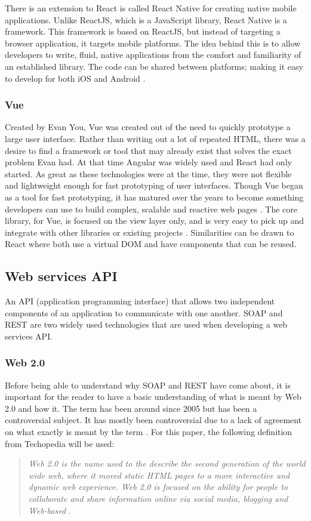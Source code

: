 There is an extension to React is called React Native for creating native mobile applications. Unlike ReactJS, which is a JavaScript library,
React Native is a framework. 
This framework is based on ReactJS, but instead of targeting a browser application, it targets mobile platforms.
The idea behind this is to allow developers to write, fluid, native applications from the comfort and familiarity of an established library.
The code can be shared between platforms; making it easy to develop for both iOS and Android \cite{eisenman2015learning}.

\subsubsection{Vue}
Created by Evan You, Vue was created out of the need to quickly prototype a large user interface.
Rather than writing out a lot of repeated HTML, there was a desire to find a framework or tool that may already exist that solves the exact problem Evan had.
At that time Angular was widely used and React had only started. As great as these technologies were at the time, they were not flexible and lightweight
enough for fast prototyping of user interfaces. Though Vue began as a tool for fast prototyping, it has matured over the
years to become something developers can use to build complex, scalable and reactive web pages \cite{filipova2016learning}.
The core library, for Vue, is focused on the view layer only, and is very easy to pick up and integrate with other libraries or existing projects \cite{koetsier2016evaluation}.
Similarities can be drawn to React where both use a virtual DOM and have components that can be reused.

\subsection{Web services API} \label{web services}
An API (application programming interface) that allows two independent components of an application to communicate with one another.
SOAP and REST are two widely used technologies that are used when developing a web services API.

\subsubsection{Web 2.0}
Before being able to understand why SOAP and REST have come about, it is important for the reader to have a basic understanding of what is meant by Web 2.0 and how it.
The term has been around since 2005 but has been a controversial subject. It has mostly been controversial due to a lack of agreement on what exactly is meant
by the term \cite{constantinides2008web}. For this paper, the following definition from Techopedia will be used:
\begin{quotation}
    \noindent
    \textit{
        Web 2.0 is the name used to the describe the second generation of the world wide web, where it moved static HTML pages to a more interactive and 
        dynamic web experience.
        Web 2.0 is focused on the ability for people to collaborate and share information online via social media, blogging and Web-based
    }
    \cite{web2definition}. 
\end{quotation} 

